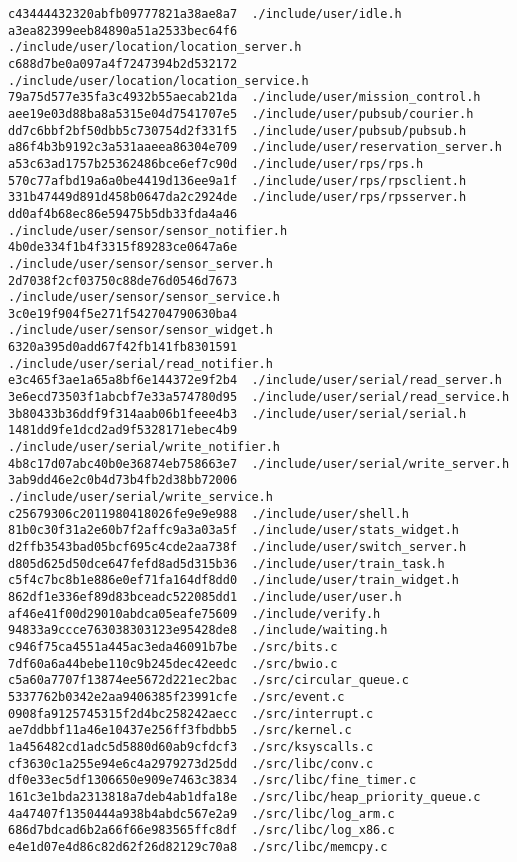 \documentclass{article}
\begin{document}
\begin{verbatim}
c43444432320abfb09777821a38ae8a7  ./include/user/idle.h
a3ea82399eeb84890a51a2533bec64f6  ./include/user/location/location_server.h
c688d7be0a097a4f7247394b2d532172  ./include/user/location/location_service.h
79a75d577e35fa3c4932b55aecab21da  ./include/user/mission_control.h
aee19e03d88ba8a5315e04d7541707e5  ./include/user/pubsub/courier.h
dd7c6bbf2bf50dbb5c730754d2f331f5  ./include/user/pubsub/pubsub.h
a86f4b3b9192c3a531aaeea86304e709  ./include/user/reservation_server.h
a53c63ad1757b25362486bce6ef7c90d  ./include/user/rps/rps.h
570c77afbd19a6a0be4419d136ee9a1f  ./include/user/rps/rpsclient.h
331b47449d891d458b0647da2c2924de  ./include/user/rps/rpsserver.h
dd0af4b68ec86e59475b5db33fda4a46  ./include/user/sensor/sensor_notifier.h
4b0de334f1b4f3315f89283ce0647a6e  ./include/user/sensor/sensor_server.h
2d7038f2cf03750c88de76d0546d7673  ./include/user/sensor/sensor_service.h
3c0e19f904f5e271f542704790630ba4  ./include/user/sensor/sensor_widget.h
6320a395d0add67f42fb141fb8301591  ./include/user/serial/read_notifier.h
e3c465f3ae1a65a8bf6e144372e9f2b4  ./include/user/serial/read_server.h
3e6ecd73503f1abcbf7e33a574780d95  ./include/user/serial/read_service.h
3b80433b36ddf9f314aab06b1feee4b3  ./include/user/serial/serial.h
1481dd9fe1dcd2ad9f5328171ebec4b9  ./include/user/serial/write_notifier.h
4b8c17d07abc40b0e36874eb758663e7  ./include/user/serial/write_server.h
3ab9dd46e2c0b4d73b4fb2d38bb72006  ./include/user/serial/write_service.h
c25679306c2011980418026fe9e9e988  ./include/user/shell.h
81b0c30f31a2e60b7f2affc9a3a03a5f  ./include/user/stats_widget.h
d2ffb3543bad05bcf695c4cde2aa738f  ./include/user/switch_server.h
d805d625d50dce647fefd8ad5d315b36  ./include/user/train_task.h
c5f4c7bc8b1e886e0ef71fa164df8dd0  ./include/user/train_widget.h
862df1e336ef89d83bceadc522085dd1  ./include/user/user.h
af46e41f00d29010abdca05eafe75609  ./include/verify.h
94833a9ccce763038303123e95428de8  ./include/waiting.h
c946f75ca4551a445ac3eda46091b7be  ./src/bits.c
7df60a6a44bebe110c9b245dec42eedc  ./src/bwio.c
c5a60a7707f13874ee5672d221ec2bac  ./src/circular_queue.c
5337762b0342e2aa9406385f23991cfe  ./src/event.c
0908fa9125745315f2d4bc258242aecc  ./src/interrupt.c
ae7ddbbf11a46e10437e256ff3fbdbb5  ./src/kernel.c
1a456482cd1adc5d5880d60ab9cfdcf3  ./src/ksyscalls.c
cf3630c1a255e94e6c4a2979273d25dd  ./src/libc/conv.c
df0e33ec5df1306650e909e7463c3834  ./src/libc/fine_timer.c
161c3e1bda2313818a7deb4ab1dfa18e  ./src/libc/heap_priority_queue.c
4a47407f1350444a938b4abdc567e2a9  ./src/libc/log_arm.c
686d7bdcad6b2a66f66e983565ffc8df  ./src/libc/log_x86.c
e4e1d07e4d86c82d62f26d82129c70a8  ./src/libc/memcpy.c

\end{verbatim}
\end{document}
